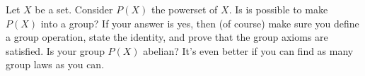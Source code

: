   Let $X$ be a set.
  Consider $P(X)$ the powerset of $X$.
  Is is possible to make $P(X)$ into a group? If your answer is yes, then
  (of course) make sure you define a group operation,
  state the identity, and prove that the group axioms are
  satisfied. Is your group $P(X)$ abelian?
  It's even better if you can find as many group laws as you can.
